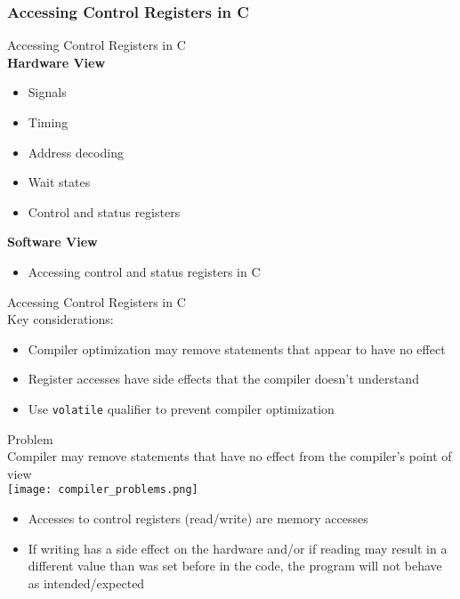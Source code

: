 \subsubsection{Accessing Control Registers in C}


\begin{definition}{Accessing Control Registers in C}\\
    \textbf{Hardware View}
    \begin{itemize}
        \item Signals
        \item Timing
        \item Address decoding
        \item Wait states
        \item Control and status registers
    \end{itemize}
    \textbf{Software View}
    \begin{itemize}
        \item Accessing control and status registers in C
    \end{itemize}
\end{definition}

\begin{concept}{Accessing Control Registers in C}\\
Key considerations:
\begin{itemize}
    \item Compiler optimization may remove statements that appear to have no effect
    \item Register accesses have side effects that the compiler doesn't understand
    \item Use \texttt{volatile} qualifier to prevent compiler optimization
\end{itemize}
\end{concept}

\multend

\begin{concept}{Problem}\\
    Compiler may remove statements that have no effect from the compiler's point of view\\
    \texttt{[image: compiler\_problems.png]}
    \begin{itemize}
        \item Accesses to control registers (read/write) are memory accesses
        \item If writing has a side effect on the hardware and/or if reading may result in a different value than was set before in the code,
        the program will not behave as intended/expected
    \end{itemize}
\end{concept}

